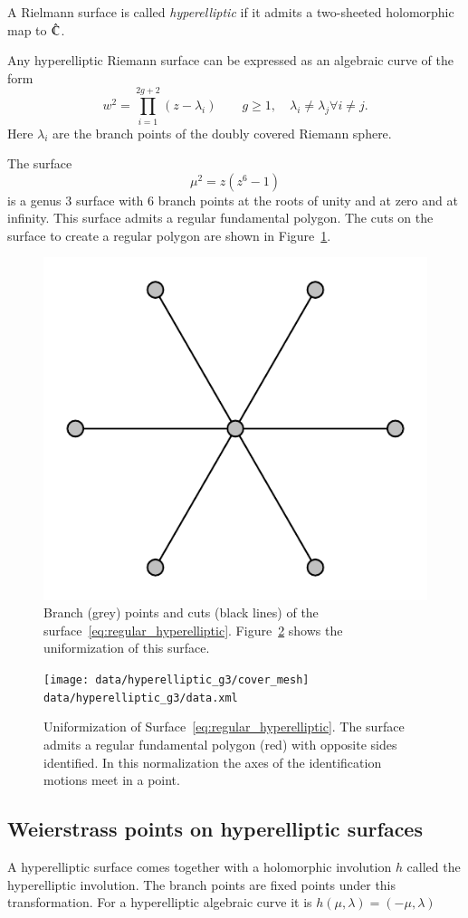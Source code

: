 \documentclass[Thesis.tex]{subfiles}
\begin{document}
\begin{definition}
	A Rielmann surface is called \emph{hyperelliptic} if it admits a two-sheeted holomorphic map to
$\hat{\mathbb C}$.
\end{definition}

Any hyperelliptic Riemann surface can be expressed as an algebraic curve of the form
\[ w^2 = \prod_{i=1}^{2g+2}(z-\lambda_i) \quad\quad g\geq1,\quad \lambda_i\neq \lambda_j \forall i\neq j.\]
Here $\lambda_i$ are the branch points of the doubly covered Riemann sphere.

\begin{example}
The surface 
\begin{equation}
	\label{eq:regular_hyperelliptic}
	\mu^2=z(z^6-1)
\end{equation} 
is a genus $3$ surface with $6$ branch points at the 
roots of unity and at zero and at infinity. This surface admits a regular fundamental polygon.
The cuts on the surface to create a regular polygon are shown in Figure~\ref{fig:regular_branchdata}.
\end{example}

\begin{figure}
\centering
\includegraphics[width=0.2\linewidth]{data/hyperelliptic_g3/curve}
\caption{Branch (grey) points and cuts (black lines) of the surface~\ref{eq:regular_hyperelliptic}.
Figure~\ref{fig:regular_cover} shows the uniformization of this surface.}
\label{fig:regular_branchdata}
\end{figure}

\begin{figure}
\centering
\texttt{[image: data/hyperelliptic\_g3/cover\_mesh]}
{\scriptsize\tt data/hyperelliptic\_g3/data.xml}
\caption{Uniformization of Surface~\ref{eq:regular_hyperelliptic}. The surface admits
a regular fundamental polygon (red) with opposite sides identified. In this normalization
the axes of the identification motions meet in a point.}
\label{fig:regular_cover}
\end{figure}


\subsection{Weierstrass points on hyperelliptic surfaces}
A hyperelliptic surface comes together with a holomorphic involution $h$ called the hyperelliptic involution. The branch points are fixed points under this transformation. For a hyperelliptic algebraic curve it is $h(\mu, \lambda)=(-\mu, \lambda)$
\end{document}
